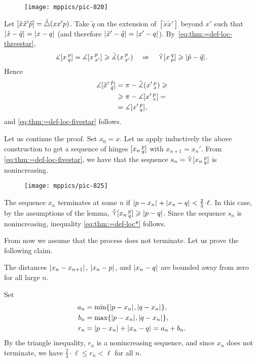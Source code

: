 {

\begin{wrapfigure}{r}{30 mm}
\vskip-8mm
\centering
\texttt{[image: mppics/pic-820]}
\vskip-4mm
\end{wrapfigure}

Let
$[\tilde x\tilde x'\tilde p]=\tilde\triangle(x x' p)$.
Take $\tilde  q$ on the extension of $[\tilde  x\tilde  x']$ beyond $x'$ such that $|{\tilde x}-{\tilde q}|_{}^{{}}=|{x}-{q}|_{}^{{}}$ (and therefore $|{\tilde x'}-{\tilde q}|_{}^{{}}=|{x'}-{q}|_{}^{{}}$).
By~\ref{eq:thm:=def-loc-threestar},
\[\measuredangle[x\,{}^{p}_{q}]
=\measuredangle[x\,{}^{p}_{x'}]\geqslant\tilde\measuredangle(x\,{}^{p}_{x'})\quad \Rightarrow\quad 
\mathop{\tilde\curlyvee}\nolimits [x\,{}^{q}_{p}]\geqslant|{\tilde p}-{\tilde q}|_{}^{{}}.\]
Hence
\begin{align*}
\measuredangle[\tilde x'\,{}^{\tilde p}_{\tilde q}]&= 
\pi
-\tilde\measuredangle(x'\,{}^{p}_{x})
\geqslant
\\
&\geqslant
\pi-\measuredangle[x'\,{}^{p}_{x}]
=
\\
&=
\measuredangle[x'\,{}^{p}_{q}],
\end{align*}
and \ref{eq:thm:=def-loc-fivestar} follows.

}

\medskip

Let us continue the proof.
Set $x_0=x$.
Let us apply inductively the above construction to get a sequence of hinges  $[x_n\,{}^{p}_{q}]$ with $x_{n+1}=x_n'$.
From \ref{eq:thm:=def-loc-fivestar}, we have that the sequence  $s_n=\mathop{\tilde\curlyvee}\nolimits [x_n\,{}^{p}_{q}]$ is nonincreasing.
\begin{figure}[ht!]
\centering
\texttt{[image: mppics/pic-825]}
\end{figure}

The sequence $x_n$ terminates at some $n$ if
$\dist{p}{x_n}{}+\dist{x_n}{q}{}
\z<\tfrac{2}{3}\cdot\ell$.
In this case, by the assumptions of the lemma, $\mathop{\tilde\curlyvee}\nolimits [x_n\,{}^{p}_{q}]\geqslant|{p}-{q}|_{}^{{}}$.
Since the sequence $s_n$ is nonincreasing, inequality \ref{eq:thm:=def-loc*} follows.

From now we assume that the process does not terminate.
Let us prove the following claim.
\begin{clm}{}\label{clm:>0}
The distances
$|{x_n}-{x_{n+1}}|_{}^{{}}$, $|{x_n}-{p}|_{}^{{}}$, and $|{x_n}-{q}|_{}^{{}}$ are bounded away from zero for all large $n$.
\end{clm}

Set
\begin{align*}
a_n&=\min\{|{p}-{x_n}|_{}^{{}},|{q}-{x_n}|_{}^{{}}\},
\\
b_n&=\max\{|{p}-{x_n}|_{}^{{}},|{q}-{x_n}|_{}^{{}}\},
\\
r_n&=|{p}-{x_n}|_{}^{{}}+|{x_n}-{q}|_{}^{{}}=a_n+b_n.
\end{align*}
By the triangle inequality, $r_n$ is a nonincreasing sequence,
and since $x_n$ does not terminate, we have $\tfrac{2}{3}\cdot\ell\le r_n<\ell$ for all $n$.

